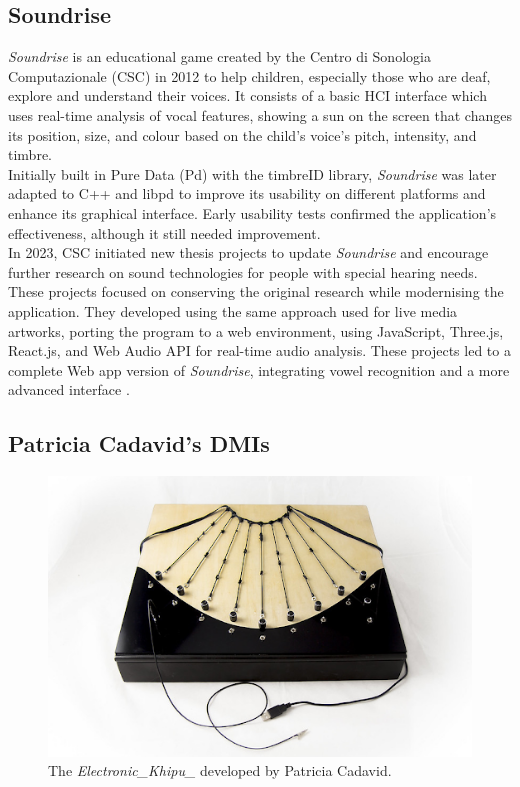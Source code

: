 \subsection*{Soundrise}
\textit{Soundrise} is an educational game created by the Centro di Sonologia Computazionale (CSC) in 2012 to help children, especially those who are deaf, explore and understand their voices. It consists of a basic HCI interface which uses real-time analysis of vocal features, showing a sun on the screen that changes its position, size, and colour based on the child's voice's pitch, intensity, and timbre.\\
Initially built in Pure Data (Pd) with the timbreID library, \textit{Soundrise} was later adapted to C++ and libpd to improve its usability on different platforms and enhance its graphical interface. Early usability tests confirmed the application's effectiveness, although it still needed improvement.\\
In 2023, CSC initiated new thesis projects to update \textit{Soundrise} and encourage further research on sound technologies for people with special hearing needs. These projects focused on conserving the original research while modernising the application. They developed using the same approach used for live media artworks, porting the program to a web environment, using JavaScript, Three.js, React.js, and Web Audio API for real-time audio analysis. These projects led to a complete Web app version of \textit{Soundrise}, integrating vowel recognition and a more advanced interface \cite{fiordelmondo2024nime}.
\subsection*{Patricia Cadavid's DMIs}

\begin{figure}[!h]
    \centering
    \includegraphics[width=\linewidth]{chapters/appendix/d/image/figd-khipu.png}
    \caption{The \textit{Electronic\_Khipu\_} developed by Patricia Cadavid.}
    \label{fig:ad-khipu}
\end{figure}

